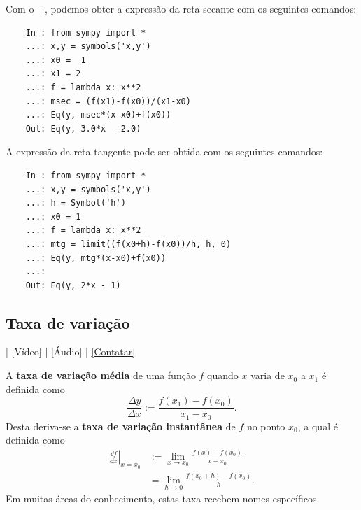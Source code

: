 \begin{ex}
  \ifispython
  Com o {\python}+{\sympy}, podemos obter a expressão da reta secante com os seguintes comandos:
  \begin{lstlisting}
    In : from sympy import *
    ...: x,y = symbols('x,y')
    ...: x0 =  1
    ...: x1 = 2
    ...: f = lambda x: x**2
    ...: msec = (f(x1)-f(x0))/(x1-x0)
    ...: Eq(y, msec*(x-x0)+f(x0))
    Out: Eq(y, 3.0*x - 2.0)
  \end{lstlisting}
  A expressão da reta tangente pode ser obtida com os seguintes comandos:
  \begin{lstlisting}
    In : from sympy import *
    ...: x,y = symbols('x,y')
    ...: h = Symbol('h')
    ...: x0 = 1
    ...: f = lambda x: x**2
    ...: mtg = limit((f(x0+h)-f(x0))/h, h, 0)
    ...: Eq(y, mtg*(x-x0)+f(x0))
    ...: 
    Out: Eq(y, 2*x - 1)
  \end{lstlisting}
  \fi
\end{ex}

\subsection{Taxa de variação}

\begin{flushright}
  [YouTube] | [Vídeo] | [Áudio] | \href{https://phkonzen.github.io/notas/contato.html}{[Contatar]}
\end{flushright}

A {\bf taxa de variação média} de uma função $f$ quando $x$ varia de $x_0$ a $x_1$ é definida como
\begin{equation}
  \frac{\Delta y}{\Delta x} := \frac{f(x_1)-f(x_0)}{x_1-x_0}. 
\end{equation}
Desta deriva-se a {\bf taxa de variação instantânea} de $f$ no ponto $x_0$, a qual é definida como
\begin{align}
  \left.\frac{\dd f}{\dd x}\right|_{x=x_0} &:= \lim_{x\to x_0} \frac{f(x)-f(x_0)}{x-x_0}\\
                             &= \lim_{h\to 0} \frac{f(x_0+h)-f(x_0)}{h}.
\end{align}
Em muitas áreas do conhecimento, estas taxa recebem nomes específicos.

